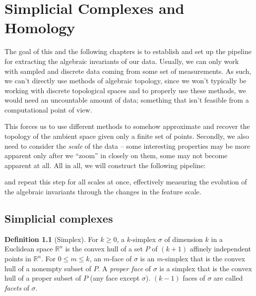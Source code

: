 \chapter{Simplicial Complexes and Homology}
\graphicspath{ {/home/tomasp/Dokumenty/Master_Thesis/figures/} }
\theoremstyle{definition}
\newtheorem{definition}{Definition}[section]
\newtheorem{theorem}{Theorem}[section]
\newtheorem{lemma}{Lemma}[section]
\newtheorem{corollary}{Corollary}[section]
\newtheorem{example}{Example}[section]
\newtheorem*{remark}{Remark}

The goal of this and the following chapters is to establish and set up the pipeline for extracting the algebraic invariants of our data. Usually, we can only work with sampled and discrete data coming from some set of measurements. As such, we can't directly use methods of algebraic topology, since we won't typically be working with discrete topological spaces and to properly use these methods, we would need an uncountable amount of data; something that isn't feasible from a computational point of view.
\par
This forces us to use different methods to somehow approximate and recover the topology of the ambient space given only a finite set of points. Secondly, we also need to consider the \textit{scale} of the data -- some interesting properties may be more apparent only after we ``zoom'' in closely on them, some may not become apparent at all. All in all, we will construct the following pipeline:

\begin{center}
\end{center}

and repeat this step for all scales at once, effectively measuring the evolution of the algebraic invariants through the changes in the feature scale.

\section{Simplicial complexes}
\begin{definition}[Simplex]
  For $k \geq 0$, a $k$-simplex $\sigma$ of dimension $k$ in a Euclidean space $\mathbb{R}^{n}$ is the convex hull of a set $P$ of $(k+1)$ affinely independent points in $\mathbb{R}^{n}$. For $0 \leq m \leq k$, an $m$-face of $\sigma$ is an $m$-simplex that is the convex hull of a nonempty subset of $P$. A \textit{proper face} of $\sigma$ is a simplex that is the convex hull of a proper subset of $P$ (any face except $\sigma$). $(k-1)$ faces of $\sigma$ are called \textit{facets} of $\sigma$.
\end{definition}

